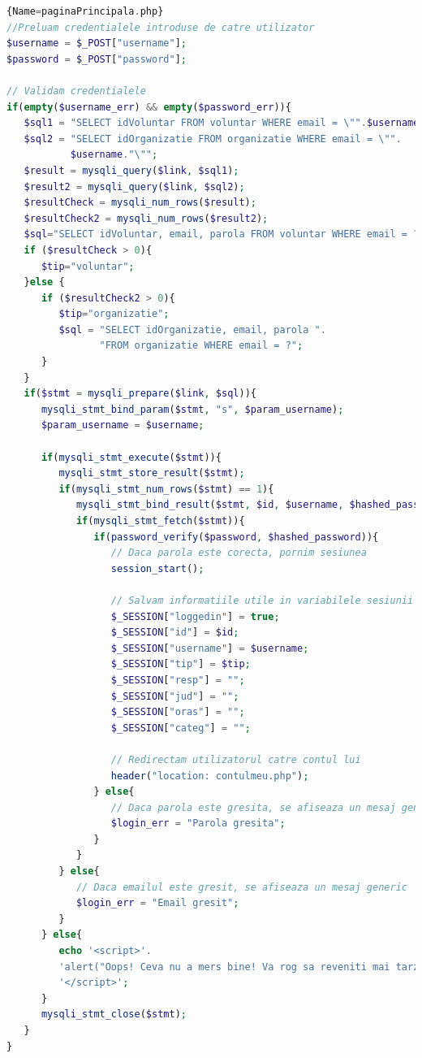 \documentclass[12pt,a4paper]{report}
\begin{document}
\begin{lstlisting}[basicstyle=\small, language=PHP]{Name=paginaPrincipala.php}
//Preluam credentialele introduse de catre utilizator
$username = $_POST["username"];
$password = $_POST["password"];

// Validam credentialele
if(empty($username_err) && empty($password_err)){
   $sql1 = "SELECT idVoluntar FROM voluntar WHERE email = \"".$username."\"";
   $sql2 = "SELECT idOrganizatie FROM organizatie WHERE email = \"".
           $username."\"";
   $result = mysqli_query($link, $sql1);
   $result2 = mysqli_query($link, $sql2);
   $resultCheck = mysqli_num_rows($result);
   $resultCheck2 = mysqli_num_rows($result2);
   $sql="SELECT idVoluntar, email, parola FROM voluntar WHERE email = ?";
   if ($resultCheck > 0){
      $tip="voluntar";
   }else {
      if ($resultCheck2 > 0){
         $tip="organizatie";
         $sql = "SELECT idOrganizatie, email, parola ".
                "FROM organizatie WHERE email = ?";
      }
   }
   if($stmt = mysqli_prepare($link, $sql)){
      mysqli_stmt_bind_param($stmt, "s", $param_username);
      $param_username = $username;

      if(mysqli_stmt_execute($stmt)){
         mysqli_stmt_store_result($stmt);
         if(mysqli_stmt_num_rows($stmt) == 1){
            mysqli_stmt_bind_result($stmt, $id, $username, $hashed_password);
            if(mysqli_stmt_fetch($stmt)){
               if(password_verify($password, $hashed_password)){
                  // Daca parola este corecta, pornim sesiunea
                  session_start();

                  // Salvam informatiile utile in variabilele sesiunii
                  $_SESSION["loggedin"] = true;
                  $_SESSION["id"] = $id;
                  $_SESSION["username"] = $username;
                  $_SESSION["tip"] = $tip;
                  $_SESSION["resp"] = "";
                  $_SESSION["jud"] = "";
                  $_SESSION["oras"] = "";
                  $_SESSION["categ"] = "";

                  // Redirectam utilizatorul catre contul lui
                  header("location: contulmeu.php");
               } else{
                  // Daca parola este gresita, se afiseaza un mesaj generic
                  $login_err = "Parola gresita";
               }
            }
         } else{
            // Daca emailul este gresit, se afiseaza un mesaj generic
            $login_err = "Email gresit";
         }
      } else{
         echo '<script>'.
         'alert("Oops! Ceva nu a mers bine! Va rog sa reveniti mai tarziu");'.
         '</script>';
      }
      mysqli_stmt_close($stmt);
   }
}
\end{lstlisting}
\end{document}
